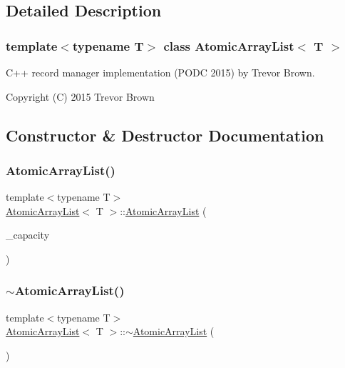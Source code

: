 \subsection{Detailed Description}
\subsubsection*{template$<$typename T$>$\newline
class Atomic\+Array\+List$<$ T $>$}

C++ record manager implementation (P\+O\+DC 2015) by Trevor Brown.

Copyright (C) 2015 Trevor Brown 

\subsection{Constructor \& Destructor Documentation}
\mbox{\label{classAtomicArrayList_a0eff0d932ebe8b70dbe405688b8419f4}} 
\subsubsection{\texorpdfstring{Atomic\+Array\+List()}{AtomicArrayList()}}
{\footnotesize\ttfamily template$<$typename T$>$ \\
\hyperlink{classAtomicArrayList}{Atomic\+Array\+List}$<$ T $>$\+::\hyperlink{classAtomicArrayList}{Atomic\+Array\+List} (\begin{DoxyParamCaption}\item[{const int}]{\+\_\+capacity }\end{DoxyParamCaption})\hspace{0.3cm}{\ttfamily [inline]}}

\mbox{\label{classAtomicArrayList_a21884144e433db89fb1120cd8e40a2c6}} 
\subsubsection{\texorpdfstring{$\sim$\+Atomic\+Array\+List()}{~AtomicArrayList()}}
{\footnotesize\ttfamily template$<$typename T$>$ \\
\hyperlink{classAtomicArrayList}{Atomic\+Array\+List}$<$ T $>$\+::$\sim$\hyperlink{classAtomicArrayList}{Atomic\+Array\+List} (\begin{DoxyParamCaption}{ }\end{DoxyParamCaption})\hspace{0.3cm}{\ttfamily [inline]}}



